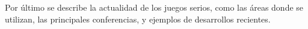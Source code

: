 Por último se describe la actualidad de los juegos serios, como las áreas donde
se utilizan, las principales conferencias, y ejemplos de desarrollos recientes. 






